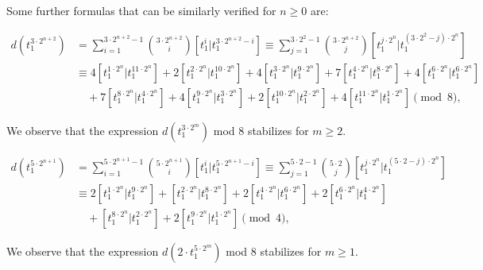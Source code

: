 \begin{exm} \label{exm:formulas}
Some further formulas that can be similarly verified for $n \geq 0$ are:

\begin{align*}
  d(t_1^{3 \cdot 2^{n+2}}) &= \sum_{i=1}^{3 \cdot 2^{n+2} - 1} \binom{3 \cdot 2^{n+2}}{i} [t_1^i | t_1^{3 \cdot 2^{n+2} - i}] 
  \equiv \sum_{j=1}^{3 \cdot 2^{2} -1} \binom{3 \cdot 2^{n+2}}{j} [t_1^{j \cdot 2^{n}} | t_1^{(3 \cdot 2^{2} - j) \cdot 2^{n}}] \\
  &\equiv 4 [t_1^{1 \cdot 2^{n}} | t_1^{11 \cdot 2^{n}}]
  + 2 [t_1^{2 \cdot 2^{n}} | t_1^{10 \cdot 2^{n}}]
  + 4 [t_1^{3 \cdot 2^{n}} | t_1^{9 \cdot 2^{n}}]
  + 7 [t_1^{4 \cdot 2^{n}} | t_1^{8 \cdot 2^{n}}]
  + 4 [t_1^{6 \cdot 2^{n}} | t_1^{6 \cdot 2^{n}}] \\
  &\quad 
  + 7 [t_1^{8 \cdot 2^{n}} | t_1^{4 \cdot 2^{n}}]
  + 4 [t_1^{9 \cdot 2^{n}} | t_1^{3 \cdot 2^{n}}]
  + 2 [t_1^{10 \cdot 2^{n}} | t_1^{2 \cdot 2^{n}}]
  + 4 [t_1^{11 \cdot 2^{n}} | t_1^{1 \cdot 2^{n}}] \pmod{8},
\end{align*}

We observe that the expression $d(t_1^{3 \cdot 2^{m}})$ mod 8 stabilizes for $m \geq 2$.

\begin{align*}
  d(t_1^{5 \cdot 2^{n+1}})
  &= \sum_{i=1}^{5 \cdot 2^{n+1} - 1} \binom{5 \cdot 2^{n+1}}{i} [t_1^i | t_1^{5 \cdot 2^{n+1} - i}]
  \equiv \sum_{j=1}^{5 \cdot 2 -1} \binom{5 \cdot 2}{j} [t_1^{j \cdot 2^{n}} | t_1^{(5 \cdot 2 - j) \cdot 2^{n}}] \\
  &\equiv 2 [t_1^{1 \cdot 2^{n}} | t_1^{9 \cdot 2^{n}}]
  + [t_1^{2 \cdot 2^{n}} | t_1^{8 \cdot 2^{n}}]
  + 2 [t_1^{4 \cdot 2^{n}} | t_1^{6 \cdot 2^{n}}]
  + 2 [t_1^{6 \cdot 2^{n}} | t_1^{4 \cdot 2^{n}}] \\
  &\quad + [t_1^{8 \cdot 2^{n}} | t_1^{2 \cdot 2^{n}}]
  + 2 [t_1^{9 \cdot 2^{n}} | t_1^{1 \cdot 2^{n}}] \pmod{4},
\end{align*}

We observe that the expression $d(2 \cdot t_1^{5 \cdot 2^{m}})$ mod 8 stabilizes for $m \geq 1$.


\end{exm}
